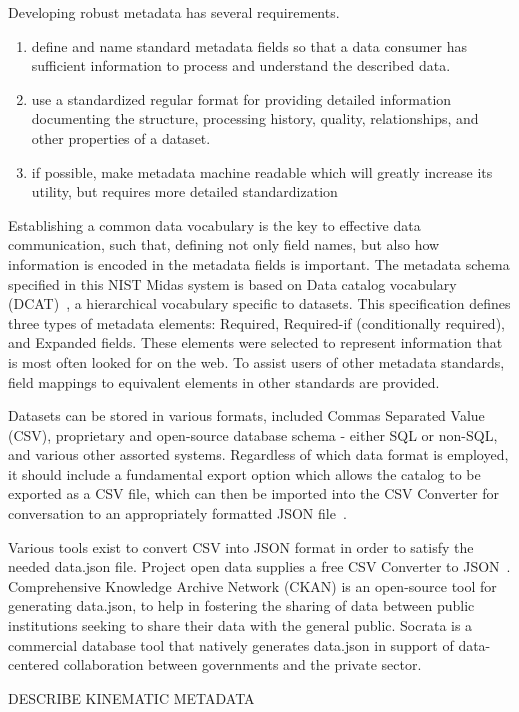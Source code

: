 Developing robust metadata has several requirements. 
\begin{enumerate}
    \item define and name standard metadata fields so that a data consumer has sufficient information to process and understand the described data.
    \item use a standardized regular format for providing detailed information documenting the structure, processing history, quality, relationships, and other properties of a dataset. 
    \item if possible, make metadata machine readable which will greatly increase its utility, but requires more detailed standardization
\end{enumerate} 


Establishing a common data vocabulary is the key to effective data communication, such that, defining not only field names, but also how information is encoded in the metadata fields is important.  The metadata schema specified in this NIST Midas system is based on Data catalog vocabulary {(DCAT)}~\cite{maali2014data}, a hierarchical vocabulary specific to datasets. This specification defines three types of metadata elements: Required, Required-if (conditionally required), and Expanded fields. These elements were selected to represent information that is most often looked for on the web. To assist users of other metadata standards, field mappings to equivalent elements in other standards are provided.

Datasets can be stored in various formats, included Commas Separated Value (CSV), proprietary and open-source database schema - either SQL or non-SQL, and various other assorted  systems. Regardless of which data format is employed, it should include a fundamental export option which allows the catalog to be exported as a CSV file, which can then be imported into the CSV Converter for conversation to an appropriately formatted JSON file~\cite{project-open-data}.

Various tools exist to convert CSV into JSON format in order to satisfy the needed data.json file. Project open data supplies a free CSV Converter to JSON~\cite{csvconverter}. Comprehensive Knowledge Archive Network (CKAN)
 is an open-source tool for generating data.json, to help in fostering the sharing of data between public institutions seeking to share their data with the general public.
Socrata is a commercial database tool that natively generates data.json in support of data-centered collaboration between governments and the private sector.

DESCRIBE KINEMATIC METADATA



